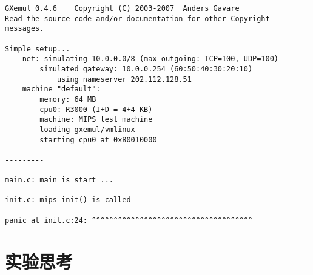 \begin{verbatim}
GXemul 0.4.6    Copyright (C) 2003-2007  Anders Gavare
Read the source code and/or documentation for other Copyright messages.

Simple setup...
    net: simulating 10.0.0.0/8 (max outgoing: TCP=100, UDP=100)
        simulated gateway: 10.0.0.254 (60:50:40:30:20:10)
            using nameserver 202.112.128.51
    machine "default":
        memory: 64 MB
        cpu0: R3000 (I+D = 4+4 KB)
        machine: MIPS test machine
        loading gxemul/vmlinux
        starting cpu0 at 0x80010000
-------------------------------------------------------------------------------

main.c:	main is start ...

init.c:	mips_init() is called

panic at init.c:24: ^^^^^^^^^^^^^^^^^^^^^^^^^^^^^^^^^^^^^
\end{verbatim}

\section{实验思考}

